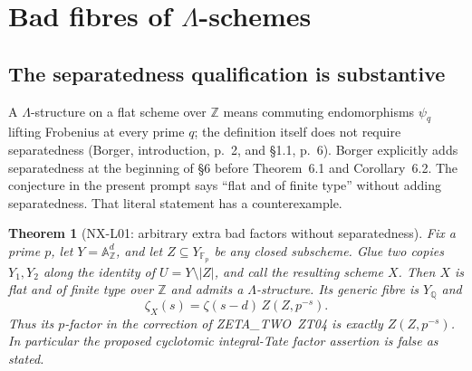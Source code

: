 \documentclass[11pt]{article}
\newtheorem{theorem}{Theorem}[section]
\theoremstyle{remark}
\begin{document}

\section{Bad fibres of $\Lambda$-schemes}

\subsection{The separatedness qualification is substantive}

A $\Lambda$-structure on a flat scheme over $\mathbb Z$ means commuting
endomorphisms $\psi_q$ lifting Frobenius at every prime $q$; the definition
itself does not require separatedness (Borger, introduction, p.~2, and
\S1.1, p.~6).  Borger explicitly adds separatedness at the beginning of
\S6 before Theorem~6.1 and Corollary~6.2.  The conjecture in the present
prompt says ``flat and of finite type'' without adding separatedness.
That literal statement has a counterexample.

\begin{theorem}[NX-L01: arbitrary extra bad factors without separatedness]
\label{NX-L01}
Fix a prime $p$, let $Y=\mathbb A^d_{\mathbb Z}$, and let
$Z\subseteq Y_{\mathbb F_p}$ be any closed subscheme.  Glue two copies
$Y_1,Y_2$ along the identity of $U=Y\setminus |Z|$, and call the resulting
scheme $X$.  Then $X$ is flat and of finite type over $\mathbb Z$ and
admits a $\Lambda$-structure.  Its generic fibre is $Y_{\mathbb Q}$ and
\[
 \zeta_X(s)=\zeta(s-d)\,Z(Z,p^{-s}).
\]
Thus its $p$-factor in the correction of ZETA\_TWO~ZT04 is exactly
$Z(Z,p^{-s})$.  In particular the proposed cyclotomic integral-Tate
factor assertion is false as stated.
\end{theorem}
\end{document}
